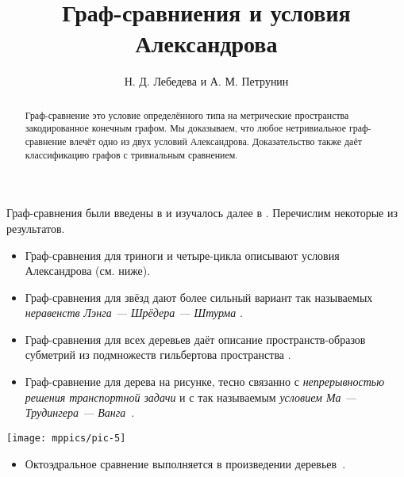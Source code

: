 \documentclass{article}
\def\thetitle{Граф-сравниения и условия Александрова}
\def\theauthors{Н. Д. Лебедева и А. М. Петрунин}
\def\parbf#1{\medskip\noindent{\bf #1}}
\begin{document}


\title{\thetitle}
\author{\theauthors}

\date{}
\maketitle
\begin{abstract}
Граф-сравнение это условие определённого типа на метрические пространства закодированное конечным графом.
Мы доказываем, что любое нетривиальное граф-сравнение влечёт одно из двух условий Александрова.
Доказательство также даёт классификацию графов с тривиальным сравнением.
\end{abstract}

\parbf{Предисловие.}
Граф-сравнения были введены в \cite{lebedeva-petrunin-zolotov} и изучалось далее в \cite{toyoda,toyoda2019,lebedeva-petrunin-CBB,lebedeva,lebedeva-petrunin,lebedeva-petrunin-octahedron}.
Перечислим некоторые из результатов.
\begin{itemize}
\item Граф-сравнения для триноги и четыре-цикла описывают условия Александрова (см. ниже).
\end{itemize}
\begin{itemize}
\item Граф-сравнения для звёзд дают более сильный вариант так называемых \emph{неравенств Лэнга --- Шрёдера --- Штурма} \cite{lang-schroeder, sturm, lebedeva-petrunin-CBB}.
\end{itemize}
\begin{itemize}
\item Граф-сравнения для всех деревьев даёт описание пространств-образов субметрий из подмножеств гильбертова пространства \cite{lebedeva-petrunin-zolotov}.
\end{itemize}

\noindent
\begin{minipage}
{.80\textwidth}
\begin{itemize}
\item Граф-сравнение для дерева на рисунке, тесно связанно с \emph{непрерывностью решения транспортной задачи} и с так называемым \emph{условием Ма --- Трудингера --- Ванга}~\cite{lebedeva-petrunin-zolotov,ma-trudinger-wang}.
\end{itemize}
\end{minipage}
\hfill
\begin{minipage}{.17\textwidth}
\centering
\vskip-1mm
\texttt{[image: mppics/pic-5]}
\end{minipage}
\begin{itemize}
\item Октоэдральное сравнение выполняется в произведении деревьев~\cite{lebedeva-petrunin-octahedron}.
\end{itemize}
\end{document}
